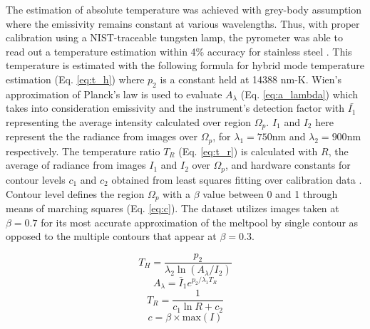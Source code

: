 The estimation of absolute temperature was achieved with grey-body assumption
where the emissivity remains constant at various wavelengths. Thus, with proper
calibration using a NIST-traceable tungsten lamp, the pyrometer was able to read
out a temperature estimation within 4\% accuracy for stainless steel
\cite{mitchell_linking_2020}. This temperature is estimated with the following
formula for hybrid mode temperature estimation (Eq. \ref{eq:t_h}) where $p_2$ is
a constant held at 14388 nm-K. Wien's approximation \cite{ikeuchi_computer_2021}
of Planck's law is used to evaluate $A_\lambda$ (Eq. \ref{eq:a_lambda}) which
takes into consideration emissivity and the instrument's detection factor with
$\bar{I_1}$ representing the average intensity calculated over region
$\Omega_p$. $I_1$ and $I_2$ here represent the the radiance from images over
$\Omega_p$, for $\lambda_1 = 750 \text{nm}$ and $\lambda_2 = 900 \text{nm}$
respectively. The temperature ratio $T_R$ (Eq. \ref{eq:t_r}) is calculated with
$R$, the average of radiance from images $I_1$ and $I_2$ over $\Omega_p$, and
hardware constants for contour levels $c_1$ and $c_2$ obtained from least
squares fitting over calibration data \cite{zalameda_four-color_2016}. Contour
level defines the region $\Omega_p$ with a $\beta$ value between 0 and 1 through
means of marching squares (Eq. \ref{eq:c}). The dataset utilizes images taken at
$\beta = 0.7$ for its most accurate approximation of the meltpool by single
contour as opposed to the multiple contours that appear at $\beta = 0.3$.

\begin{equation}
  T_H = \frac{p_2}{\lambda_2\ln\left({A_\lambda/I_2}\right)}
  \label{eq:t_h}
\end{equation}
\begin{equation}
  A_\lambda =  \bar{I}_1 e^{p_2/\lambda_1T_R}
  \label{eq:a_lambda}
\end{equation}
\begin{equation}
  T_R = \frac{1}{c_1 \ln R + c_2}
  \label{eq:t_r}
\end{equation}
\begin{equation}
  c = \beta \times \text{max}\left(I\right)
  \label{eq:c}
\end{equation}

\clearpage

